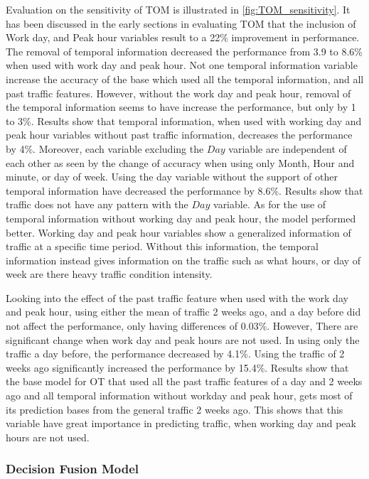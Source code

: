Evaluation on the sensitivity of TOM is illustrated in \ref{fig:TOM_sensitivity}. It has been discussed in the early sections in evaluating TOM that the inclusion of Work day, and Peak hour variables result to a 22\% improvement in performance. The removal of temporal information decreased the performance from 3.9 to 8.6\% when used with work day and peak hour. Not one temporal information variable increase the accuracy of the base which used all the temporal information, and all past traffic features. However, without the work day and peak hour, removal of the temporal information seems to have increase the performance, but only by 1 to 3\%. Results show that temporal information, when used with working day and peak hour variables without past traffic information, decreases the performance by 4\%. Moreover, each variable excluding the $Day$ variable are independent of each other as seen by the change of accuracy when using only Month, Hour and minute, or day of week. Using the day variable without the support of other temporal information have decreased the performance by 8.6\%. Results show that traffic does not have any pattern with the $Day$ variable. As for the use of temporal information without working day and peak hour, the model performed better. Working day and peak hour variables show a generalized information of traffic at a specific time period. Without this information, the temporal information instead gives information on the traffic such as what hours, or day of week are there heavy traffic condition intensity. 

Looking into the effect of the past traffic feature when used with the work day and peak hour, using either the mean of traffic 2 weeks ago, and a day before did not affect the performance, only having differences of 0.03\%. However, There are significant change when work day and peak hours are not used. In using only the traffic a day before, the performance decreased by 4.1\%. Using the traffic of 2 weeks ago significantly increased the performance by 15.4\%. Results show that the base model for OT that used all the past traffic features of a day and 2 weeks ago and all temporal information without workday and peak hour, gets most of its prediction bases from the general traffic 2 weeks ago. This shows that this variable have great importance in predicting traffic, when working day and peak hours are not used.  

\subsubsection{Decision Fusion Model}

